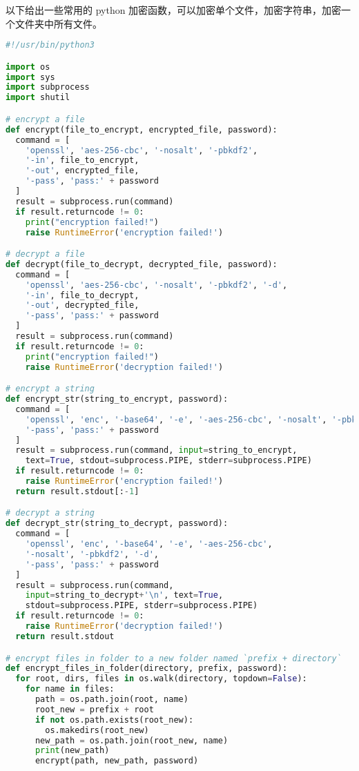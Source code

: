 
以下给出一些常用的 python 加密函数，可以加密单个文件，加密字符串，加密一个文件夹中所有文件。

\begin{lstlisting}[language=python]
#!/usr/bin/python3

import os
import sys
import subprocess
import shutil

# encrypt a file
def encrypt(file_to_encrypt, encrypted_file, password):
  command = [
    'openssl', 'aes-256-cbc', '-nosalt', '-pbkdf2',
    '-in', file_to_encrypt,
    '-out', encrypted_file,
    '-pass', 'pass:' + password
  ]
  result = subprocess.run(command)
  if result.returncode != 0:
    print("encryption failed!")
    raise RuntimeError('encryption failed!')

# decrypt a file
def decrypt(file_to_decrypt, decrypted_file, password):
  command = [
    'openssl', 'aes-256-cbc', '-nosalt', '-pbkdf2', '-d',
    '-in', file_to_decrypt,
    '-out', decrypted_file,
    '-pass', 'pass:' + password
  ]
  result = subprocess.run(command)
  if result.returncode != 0:
    print("encryption failed!")
    raise RuntimeError('decryption failed!')

# encrypt a string
def encrypt_str(string_to_encrypt, password):
  command = [
    'openssl', 'enc', '-base64', '-e', '-aes-256-cbc', '-nosalt', '-pbkdf2',
    '-pass', 'pass:' + password
  ]
  result = subprocess.run(command, input=string_to_encrypt,
    text=True, stdout=subprocess.PIPE, stderr=subprocess.PIPE)
  if result.returncode != 0:
    raise RuntimeError('encryption failed!')
  return result.stdout[:-1]

# decrypt a string
def decrypt_str(string_to_decrypt, password):
  command = [
    'openssl', 'enc', '-base64', '-e', '-aes-256-cbc',
    '-nosalt', '-pbkdf2', '-d',
    '-pass', 'pass:' + password
  ]
  result = subprocess.run(command,
    input=string_to_decrypt+'\n', text=True,
    stdout=subprocess.PIPE, stderr=subprocess.PIPE)
  if result.returncode != 0:
    raise RuntimeError('decryption failed!')
  return result.stdout

# encrypt files in folder to a new folder named `prefix + directory`
def encrypt_files_in_folder(directory, prefix, password):
  for root, dirs, files in os.walk(directory, topdown=False):
    for name in files:
      path = os.path.join(root, name)
      root_new = prefix + root
      if not os.path.exists(root_new):
        os.makedirs(root_new)
      new_path = os.path.join(root_new, name)
      print(new_path)
      encrypt(path, new_path, password)


\end{lstlisting}
